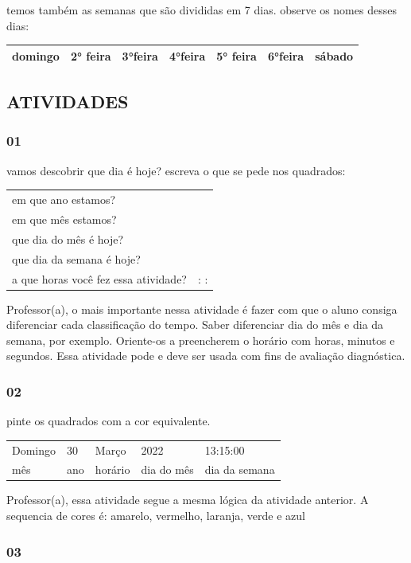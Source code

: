 temos também as semanas que são divididas em 7 dias. observe os nomes
desses dias:

\begin{longtable}[]{@{}lllllll@{}}
\toprule
domingo & 2° feira & 3°feira & 4°feira & 5° feira & 6°feira &
sábado\tabularnewline
\bottomrule
\end{longtable}

\subsection{ATIVIDADES}\label{atividades-3}

\subsubsection{01}\label{section-39}

vamos descobrir que dia é hoje? escreva o que se pede nos quadrados:

\begin{longtable}[]{@{}ll@{}}
\toprule
em que ano estamos? &\tabularnewline
em que mês estamos? &\tabularnewline
que dia do mês é hoje? &\tabularnewline
que dia da semana é hoje? &\tabularnewline
a que horas você fez essa atividade? & : :\tabularnewline
\bottomrule
\end{longtable}

Professor(a), o mais importante nessa atividade é fazer com que o aluno
consiga diferenciar cada classificação do tempo. Saber diferenciar dia
do mês e dia da semana, por exemplo. Oriente-os a preencherem o horário
com horas, minutos e segundos. Essa atividade pode e deve ser usada com
fins de avaliação diagnóstica.

\subsubsection{02}\label{section-40}

pinte os quadrados com a cor equivalente.

\begin{longtable}[]{@{}lllll@{}}
\toprule
Domingo & 30 & Março & 2022 & 13:15:00\tabularnewline
mês & ano & horário & dia do mês & dia da semana\tabularnewline
\bottomrule
\end{longtable}

Professor(a), essa atividade segue a mesma lógica da atividade anterior.
A sequencia de cores é: amarelo, vermelho, laranja, verde e azul

\subsubsection{03}\label{section-41}

